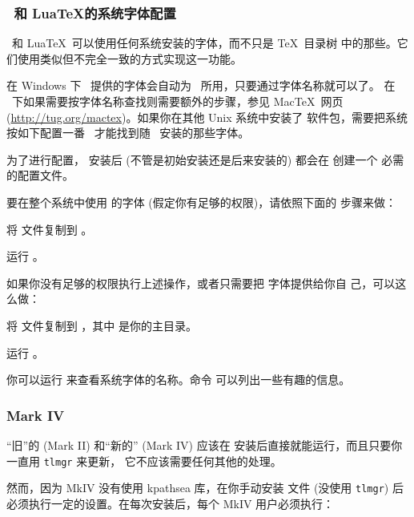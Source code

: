 \documentclass{article}
\begin{document}
\subsubsection{\protect\XeTeX\protect\ 和 Lua\protect\TeX 的系统字体配置}
\label{sec:font-conf-sys}

\XeTeX\ 和 Lua\TeX\ 可以使用任何系统安装的字体，而不只是 \TeX\ 目录树
中的那些。它们使用类似但不完全一致的方式实现这一功能。

在 Windows 下 \TL\ 提供的字体会自动为 \XeTeX\ 所用，只要通过字体名称就可以了。
在 \MacOSX\ 下如果需要按字体名称查找则需要额外的步骤，参见 Mac\TeX\ 网页
(\url{http://tug.org/mactex})。如果你在其他 Unix 系统中安装了 
软件包，需要把系统按如下配置一番 \XeTeX\ 才能找到随 \TL\ 安装的那些字体。

为了进行配置， 安装后 (不管是初始安装还是后来安装的) 都会在
 创建一个
必需的配置文件。

要在整个系统中使用 \TL{} 的字体 (假定你有足够的权限)，请依照下面的
步骤来做：
\begin{enumerate*}
\item 将  文件复制到
。
\item 运行 。
\end{enumerate*}

如果你没有足够的权限执行上述操作，或者只需要把 \TL{} 字体提供给你自
己，可以这么做：
\begin{enumerate*}
\item 将  文件复制到
      ，其中 \filename{~} 是你的主目录。
\item 运行 。
\end{enumerate*}

你可以运行  来查看系统字体的名称。命令
 可以列出一些有趣的信息。

\subsubsection{\protect\ConTeXt{} Mark IV}
\label{sec:context-mkiv}

“旧”的 \ConTeXt{} (Mark II) 和“新的” \ConTeXt{} (Mark IV)
应该在 \TL{} 安装后直接就能运行，而且只要你一直用 \verb+tlmgr+ 来更新，
它不应该需要任何其他的处理。

然而，因为 \ConTeXt{} MkIV 没有使用 kpathsea 库，在你手动安装
文件 (没使用 \verb+tlmgr+) 后必须执行一定的设置。在每次安装后，每个
MkIV 用户必须执行：
\end{document}
